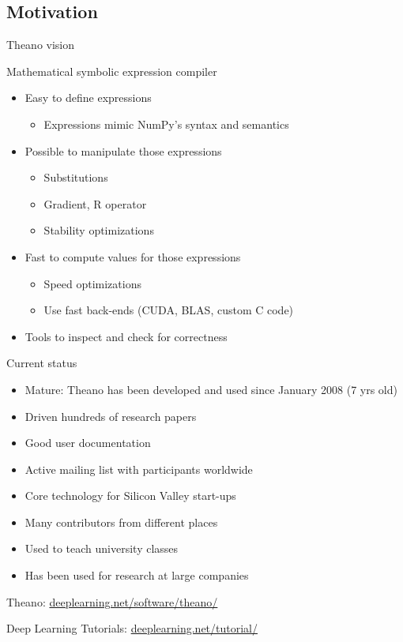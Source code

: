 \documentclass[a4paper,9pt]{beamer}
\begin{document}
\subsection{Motivation}

\begin{frame}{Theano vision}

  Mathematical symbolic expression compiler

  \begin{itemize}
    \item Easy to define expressions
      \begin{itemize}
        \item Expressions mimic NumPy's syntax and semantics
      \end{itemize}
    \item Possible to manipulate those expressions
      \begin{itemize}
        \item Substitutions
        \item Gradient, R operator
        \item Stability optimizations
      \end{itemize}
    \item Fast to compute values for those expressions
      \begin{itemize}
        \item Speed optimizations
        \item Use fast back-ends (CUDA, BLAS, custom C code)
      \end{itemize}
    \item Tools to inspect and check for correctness
  \end{itemize}
\end{frame}

\begin{frame}[fragile]{Current status}
  \begin{itemize}
    \item Mature: Theano has been developed and used since January 2008 (7 yrs old)
    \item Driven hundreds of research papers
    \item Good user documentation
    \item Active mailing list with participants worldwide
    \item Core technology for Silicon Valley start-ups
    \item Many contributors from different places
    \item Used to teach university classes
    \item Has been used for research at large companies
  \end{itemize}
  Theano: \url{deeplearning.net/software/theano/}

  Deep Learning Tutorials: \url{deeplearning.net/tutorial/}
\end{frame}
\end{document}
